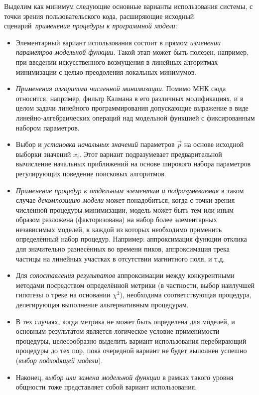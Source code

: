 Выделим как минимум следующие основные варианты использования системы,
с точки зрения пользовательского кода, расширяющие исходный
сценарий~\emph{применения процедуры к программной модели}:
\begin{itemize}
    \item Элементарный вариант использования состоит в прямом
    \emph{изменении параметров модельной функции}. Такой этап может быть
    полезен, например, при введении искусственного возмущения в
    линейных алгоритмах минимизации с целью преодоления локальных
    минимумов.
    \item \emph{Применения алгоритма численной минимизации}. Помимо МНК сюда
    относится, например, фильтр Калмана в его различных модификациях,
    и в целом задачи линейного программирования допускающие выражение
    в виде линейно-алгебраических операций над модельной функцией с
    фиксированным набором параметров.
    \item Выбор и \emph{установка начальных значений} параметров $\vec{p}$
    на основе исходной выборки значений $x_i$. Этот вариант
    подразумевает предварительной вычисление начальных приближений
    на основе широкого набора параметров регулирующих поведение
    поисковых алгоритмов.
    \item \emph{Применение процедур к отдельным элементам и подразумеваемая}
    в таком случае \emph{декомпозицию модели} может понадобиться,
    когда с точки зрения численной процедуры минимизации, модель может
    быть тем или иным образом разложена (факторизована) на набор более
    элементарных независимых моделей, к каждой из которых необходимо
    применить определённый набор процедур. Например: аппроксимация
    функции отклика для значительно разнесённых во времени пиков,
    аппроксимация трека частицы на линейных участках в отсутствии
    магнитного поля, и т.д.
    \item Для \emph{сопоставления результатов} аппроксимации между
    конкурентными методами посредством определённой метрики (в частности,
    выбор наилучшей гипотезы о треке на основании $\chi^2$), необходима
    соответствующая процедура, делегирующая выполнение альтернативным процедурам.
    \item В тех случаях, когда метрика не может быть определена для
    моделей, и основным результатом является логическое условие применимости
    процедуры, целесообразно выделить вариант использования перебирающий
    процедуры до тех пор, пока очередной вариант не будет
    выполнен успешно (\emph{выбор подходящей модели}).
    \item Наконец, \emph{выбор или замена модельной функции} в рамках
    такого уровня общности тоже представляет собой вариант использования.
\end{itemize}


